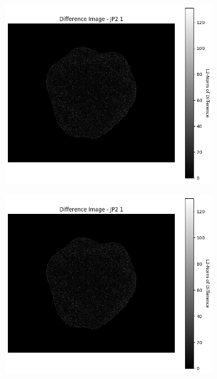 \begin{figure}[htb]
\begin{subfigure}[b]{0.48\textwidth}
        \caption{}
        \label{fig:img_quality_comp_jp2_1_histo}
    \end{subfigure}
    \\
    \begin{subfigure}[b]{0.48\textwidth}
        \centering
        \includegraphics[width=\textwidth]{doc/thesis/0_figures/compare_quality/set1/jp2_1_diff_heatmap.png}
        \caption{}
        \label{fig:img_quality_comp_jp2_1_diff}
    \end{subfigure}
    \begin{subfigure}[b]{0.48\textwidth}
        \centering
        \includegraphics[width=\textwidth]{doc/thesis/0_figures/compare_quality/set1/jp2_1_diff_heatmap_rel.png}

\end{subfigure}
\end{figure}
